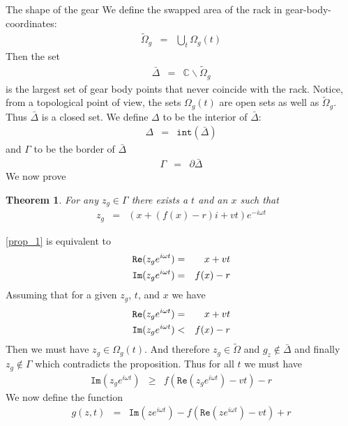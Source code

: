 \documentclass[a4paper,fleqn]{article}
\newtheorem{theorem}{Theorem}[section]
\newenvironment{proof}[1][Proof]{\begin{trivlist}
\item[\hskip \labelsep {\bfseries #1}]}{\end{trivlist}}
\numberwithin{equation}{section}
\begin{document}
\begin{subsection}{The shape of the gear}
We define the swapped area of the rack in gear-body-coordinates:
\begin{eqnarray}
	\tilde{\Omega}_g &=& \bigcup_t \Omega_g(t)
\end{eqnarray}
Then the set
\begin{eqnarray}
	\bar{\Delta} &=& \mathbb{C}\backslash \tilde{\Omega}_g
\end{eqnarray}
is the largest set of gear body points that never coincide with the rack. Notice, from a topological point of view, the sets $\Omega_g(t)$ are open sets as well as $\tilde{\Omega}_g$. Thus $\bar{\Delta}$ is a closed set.
We define $\Delta$ to be the interior of $\bar{\Delta}$:
\begin{eqnarray}
	\Delta &=& \mathtt{int} (\bar{\Delta})
\end{eqnarray}
and $\Gamma$ to be the border of $\bar{\Delta}$
\begin{eqnarray}
	\Gamma &=& \partial \bar{\Delta}
\end{eqnarray}
We now prove
\begin{theorem}
\label{th_1}
For any $z_g\in \Gamma$ there exists a $t$ and an $x$ such that
\begin{eqnarray}
\label{prop_1}	z_g &=& (x+(f(x)-r)i+vt)e^{-i\omega t}
\end{eqnarray}
\end{theorem}
\begin{proof}
\ref{prop_1} is equivalent to
\begin{eqnarray}
\mathtt{Re}(z_ge^{i\omega t}) &=& x+vt\cr
\mathtt{Im}(z_ge^{i\omega t}) &=& f(x)-r
\end{eqnarray}
Assuming that for a given $z_g$, $t$, and $x$ we have
\begin{eqnarray}
\mathtt{Re}(z_ge^{i\omega t}) &=& x+vt\cr
\mathtt{Im}(z_ge^{i\omega t}) &<& f(x)-r
\end{eqnarray}
Then we must have $z_g\in \Omega_g(t)$. And therefore $z_g \in \tilde{\Omega}$ and $g_z\notin \bar{\Delta}$ and finally $z_g \notin \Gamma$ which contradicts the proposition.
Thus for all $t$ we must have
\begin{eqnarray}
\mathtt{Im}(z_ge^{i\omega t}) &\ge& f(\mathtt{Re}(z_ge^{i\omega t})-vt)-r
\end{eqnarray}
We now define the function
\begin{eqnarray}
g(z,t) &=& \mathtt{Im}(z e^{i\omega t}) - f(\mathtt{Re}(ze^{i\omega t})-vt)+r
\end{eqnarray}

\end{proof}
\end{subsection}
\end{document}
